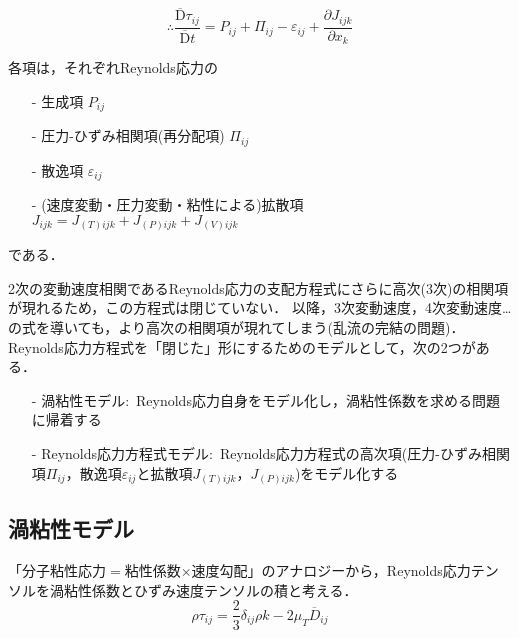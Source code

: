 \documentclass[12pt,a4paper]{jsarticle}
\begin{document}
\begin{equation}
  \therefore
  \frac{\overline{\mathrm{D}} \tau_{ij}}{\overline{\mathrm{D}} t} = P_{ij} +\Pi_{ij} -\varepsilon_{ij} +\frac{\partial J_{ijk}}{\partial x_k}
  \label{eq:ReynoldsStressEquation_Tensor} \tag{6.12}
\end{equation}

各項は，それぞれReynolds応力の
\begin{itemize}
 \item[-] 生成項 $P_{ij}$
 \item[-] 圧力-ひずみ相関項(再分配項) $\Pi_{ij}$
 \item[-] 散逸項 $\varepsilon_{ij}$
 \item[-] (速度変動・圧力変動・粘性による)拡散項 $J_{ijk} =J_{(T)ijk} +J_{(P)ijk} +J_{(V)ijk}$
\end{itemize}
である．

2次の変動速度相関であるReynolds応力の支配方程式にさらに高次(3次)の相関項が現れるため，この方程式は閉じていない．
以降，3次変動速度，4次変動速度…の式を導いても，より高次の相関項が現れてしまう(乱流の完結の問題)．\\

Reynolds応力方程式を「閉じた」形にするためのモデルとして，次の2つがある．
\begin{itemize}
 \item[-] 渦粘性モデル:~Reynolds応力自身をモデル化し，渦粘性係数を求める問題に帰着する
 \item[-] Reynolds応力方程式モデル:~Reynolds応力方程式の高次項(圧力-ひずみ相関項$\Pi_{ij}$，散逸項$\varepsilon_{ij}$と拡散項$J_{(T)ijk}$，$J_{(P)ijk}$)をモデル化する
\end{itemize}

\subsection{渦粘性モデル}
\label{subsec:EddyViscosityModel}

「分子粘性応力$=$粘性係数$\times$速度勾配」のアナロジーから，Reynolds応力テンソルを渦粘性係数とひずみ速度テンソルの積と考える．
\begin{equation}
  \rho \tau_{ij} = \frac{2}{3}\delta_{ij}\rho k -2\mu_{T} \overline{D}_{ij}
  \label{eq:EddyViscosityModel}
\end{equation}
\end{document}
